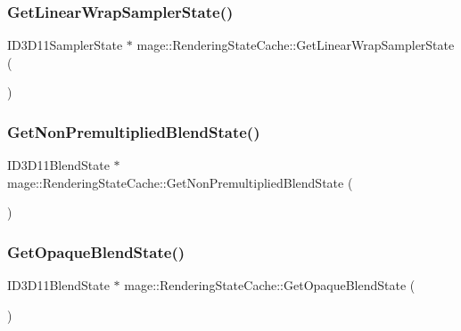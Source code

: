 \hypertarget{structmage_1_1_rendering_state_cache_abcd4b98f9c0170466551901845c86824}{}\label{structmage_1_1_rendering_state_cache_abcd4b98f9c0170466551901845c86824} 
\subsubsection{\texorpdfstring{Get\+Linear\+Wrap\+Sampler\+State()}{GetLinearWrapSamplerState()}}
{\footnotesize\ttfamily I\+D3\+D11\+Sampler\+State $\ast$ mage\+::\+Rendering\+State\+Cache\+::\+Get\+Linear\+Wrap\+Sampler\+State (\begin{DoxyParamCaption}{ }\end{DoxyParamCaption})}

\hypertarget{structmage_1_1_rendering_state_cache_ae1b3d9745e1761e45908d9ad7c4f29dd}{}\label{structmage_1_1_rendering_state_cache_ae1b3d9745e1761e45908d9ad7c4f29dd} 
\subsubsection{\texorpdfstring{Get\+Non\+Premultiplied\+Blend\+State()}{GetNonPremultipliedBlendState()}}
{\footnotesize\ttfamily I\+D3\+D11\+Blend\+State $\ast$ mage\+::\+Rendering\+State\+Cache\+::\+Get\+Non\+Premultiplied\+Blend\+State (\begin{DoxyParamCaption}{ }\end{DoxyParamCaption})}

\hypertarget{structmage_1_1_rendering_state_cache_a7208ccd74aa075e5283ad91d0efdf455}{}\label{structmage_1_1_rendering_state_cache_a7208ccd74aa075e5283ad91d0efdf455} 
\subsubsection{\texorpdfstring{Get\+Opaque\+Blend\+State()}{GetOpaqueBlendState()}}
{\footnotesize\ttfamily I\+D3\+D11\+Blend\+State $\ast$ mage\+::\+Rendering\+State\+Cache\+::\+Get\+Opaque\+Blend\+State (\begin{DoxyParamCaption}{ }\end{DoxyParamCaption})}

